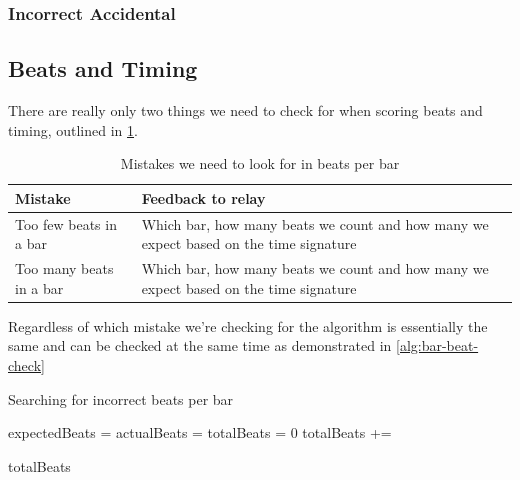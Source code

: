 \subsubsection{Incorrect Accidental}\label{sec:scoring-keysig-incorrect}


\subsection{Beats and Timing}\label{sec:scoring-beats}

There are really only two things we need to check for when scoring beats and timing, outlined in \cref{table:bar-beat-errors}.

\begin{table}[H]
    \renewcommand{\arraystretch}{1.6}
    \begin{tabularx}{\textwidth}{ lX }
        \toprule
        Mistake & Feedback to relay \\
        \midrule
        Too few beats in a bar & Which bar, how many beats we count and how many we expect based on the time signature \\
        Too many beats in a bar & Which bar, how many beats we count and how many we expect based on the time signature \\
        \bottomrule
    \end{tabularx}

    \caption{Mistakes we need to look for in beats per bar}
    \label{table:bar-beat-errors}
\end{table}

Regardless of which mistake we're checking for the algorithm is essentially the same and can be checked at the same time as demonstrated in \cref{alg:bar-beat-check}

\begin{algorithm}[H]
  \caption{Searching for incorrect beats per bar}
  \label{alg:bar-beat-check}

  \begin{algorithmic}
          \State expectedBeats = 
          \State actualBeats = 
          \EndIf
        \EndFor
    \EndProcedure
    \Statex
        \State totalBeats = 0
          \State totalBeats += 
        \EndFor

        \Return totalBeats
    \EndProcedure
  \end{algorithmic}
\end{algorithm}

